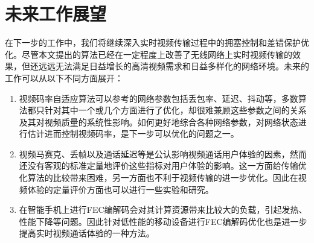 \section{未来工作展望}
在下一步的工作中，我们将继续深入实时视频传输过程中的拥塞控制和差错保护优化。尽管本文提出的算法已经在一定程度上改善了无线网络上实时视频传输的效果，但还远远无法满足日益增长的高清视频需求和日益多样化的网络环境。未来的工作可以从以下不同方面展开：
\begin{enumerate}
    \item 视频码率自适应算法可以参考的网络参数包括丢包率、延迟、抖动等，多数算法都只针对其中一个或几个方面进行了优化，却很难兼顾这些参数之间的关系及其对视频质量的系统性影响。如何更好地综合各种网络参数，对网络状态进行估计进而控制视频码率，是下一步可以优化的问题之一。
    \item 视频马赛克、丢帧以及通话延迟等是公认影响视频通话用户体验的因素，然而还没有客观的标准定量地评价这些指标对用户体验的影响。这一方面给传输优化算法的比较带来困难，另一方面也不利于视频传输的进一步优化。因此在视频体验的定量评价方面也可以进行一些实验和研究。
    \item 在智能手机上进行FEC编解码会对其计算资源带来比较大的负载，引起发热、性能下降等问题。因此针对低性能的移动设备进行FEC编解码优化也是进一步提高实时视频通话体验的一种方法。
\end{enumerate}